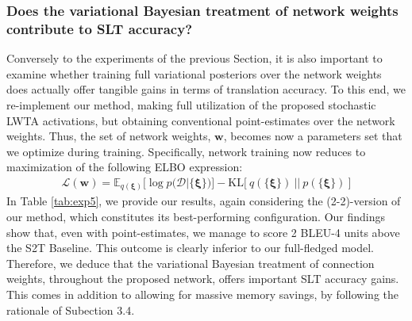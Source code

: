 \documentclass[10pt,twocolumn,letterpaper]{article}
\begin{document}
\subsubsection{Does the variational Bayesian treatment of network weights contribute to SLT accuracy?}

Conversely to the experiments of the previous Section, it is also important to examine whether training full variational posteriors over the network weights does actually offer tangible gains in terms of translation accuracy. To this end, we re-implement our method, making full utilization of the proposed stochastic LWTA activations, but obtaining conventional point-estimates over the network weights. Thus, the set of network weights, $\boldsymbol{w}$, becomes now a parameters set that we optimize during training. Specifically, network training now reduces to maximization of the following ELBO expression:
\begin{align}
\label{eqn:elbo_full}
\mathcal{L}(\boldsymbol{w}) = \mathbb{E}_{q(\boldsymbol{\xi})}\big[\log p(\mathcal{D}|\{\boldsymbol{\xi}\}) \big] - \mathrm{KL} \big[\ q(\{ \boldsymbol \xi \}) \ || \ p(\{ \boldsymbol \xi \})\ \big]
\end{align}
In Table \ref{tab:exp5}, we provide our results, again considering the (2-2)-version of our method, which constitutes its best-performing configuration. Our findings show that, even with point-estimates, we manage to score 2 BLEU-4 units above the S2T Baseline. This outcome is clearly inferior to our full-fledged model. Therefore, we deduce that the variational Bayesian treatment of connection weights, throughout the proposed network, offers important SLT accuracy gains. This comes in addition to allowing for massive memory savings, by following the rationale of Subection 3.4.
\end{document}
